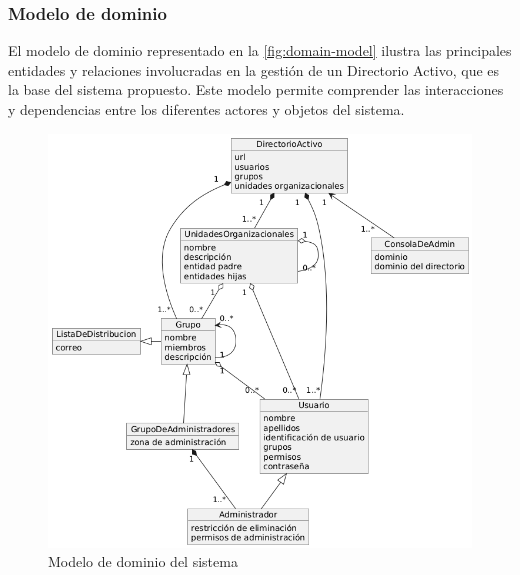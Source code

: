 \subsubsection{Modelo de dominio}

El modelo de dominio representado en la \autoref{fig:domain-model} ilustra las principales entidades y relaciones involucradas en la gestión de un Directorio Activo, que es la base del sistema propuesto. Este modelo permite comprender las interacciones y dependencias entre los diferentes actores y objetos del sistema.

\begin{figure}[h]
    \centering
    \includegraphics[width=\linewidth]{images/puml/domain-diagram/domain diagram.png}
    \caption{Modelo de dominio del sistema}
    \label{fig:domain-model}
\end{figure}